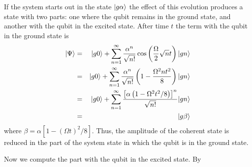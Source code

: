 \documentclass[twocolumn]{article}
\begin{document}
If the system starts out in the state $| g \alpha \rangle$ the effect of this evolution produces a state with two parts: one where the qubit remains in the ground state, and another with the qubit in the excited state. After time $t$ the term with the qubit in the ground state is \begin{eqnarray*}
| \Psi \rangle &=& | g0 \rangle + \sum_{n=1}^{\infty} \frac{\alpha^n}{\sqrt{n!}} \cos \left( \frac{\Omega}{2}\sqrt{n} t \right) | gn \rangle \\
&=& | g0 \rangle + \sum_{n=1}^{\infty} \frac{\alpha^n}{\sqrt{n!}} \left( 1 - \frac{\Omega^2 n t^2}{8}\right) | gn \rangle \\
&=& | g0 \rangle + \sum_{n=1}^{\infty} \frac{\left[ \alpha \left(1 - \Omega^2 t^2 / 8 \right) \right]^n}{\sqrt{n!}} | gn \rangle \\
&=& | g \beta \rangle \end{eqnarray*}
where $\beta = \alpha [1 - (\Omega t)^2 /8]$. Thus, the amplitude of the coherent state is reduced in the part of the system state in which the qubit is in the ground state.

Now we compute the part with the qubit in the excited state. By 
\end{document}
